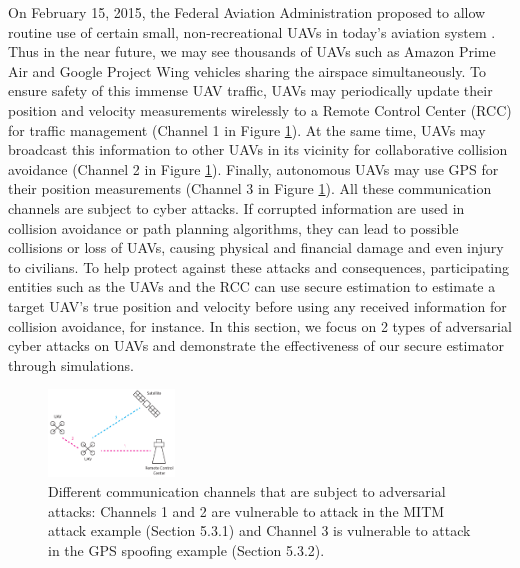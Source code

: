 \documentclass[../../thesis.tex]{subfiles}
\begin{document}
On February 15, 2015, the Federal Aviation Administration proposed to allow routine use of certain small, non-recreational UAVs in today's aviation system \cite{faa}. Thus in the near future, we may see thousands of UAVs such as Amazon Prime Air \cite{Amazon} and Google Project Wing vehicles \cite{Google} sharing the airspace simultaneously. To ensure safety of this immense UAV traffic, UAVs may periodically update their position and velocity measurements wirelessly to a Remote Control Center (RCC) for traffic management (Channel 1 in Figure \ref{fig:ex_uav_pic}). At the same time, UAVs may broadcast this information to other UAVs in its vicinity for collaborative collision avoidance (Channel 2 in Figure \ref{fig:ex_uav_pic}). Finally, autonomous UAVs may use GPS for their position measurements (Channel 3 in Figure \ref{fig:ex_uav_pic}). 
All these communication channels are subject to cyber attacks. 
If corrupted information are used in collision avoidance or path planning algorithms, they can lead to possible collisions or loss of UAVs, causing physical and financial damage and even injury to civilians.
To help protect against these attacks and consequences, participating entities such as the UAVs and the RCC can use secure estimation to estimate a target UAV's true position and velocity before using any received information for collision avoidance, for instance.
In this section, we focus on 2 types of adversarial cyber attacks on UAVs and demonstrate the effectiveness of our secure estimator through simulations.
\begin{figure}
\center
\includegraphics[width=0.3\textwidth]{chapters/se_linear/figures/qh/uav_pic.pdf}
\caption{Different communication channels that are subject to adversarial attacks: Channels 1 and 2 are vulnerable to attack in the MITM attack example (Section 5.3.1) and Channel 3 is vulnerable to attack in the GPS spoofing example (Section 5.3.2).}

\label{fig:ex_uav_pic}
\end{figure}
\end{document}
